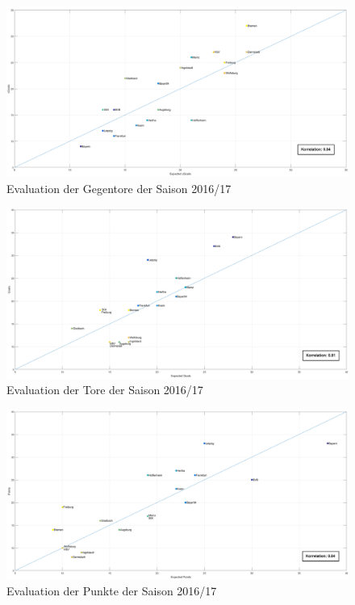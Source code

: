 \begin{figure}
\centering
\includegraphics[scale=0.3]{se-wa-jpg/cGoals_correlation_16_17}
\caption{Evaluation der Gegentore der Saison 2016/17}
\label{lines}
\end{figure}

\begin{figure}
\centering
\includegraphics[scale=0.3]{se-wa-jpg/goals_correlation_16_17}
\caption{Evaluation der Tore der Saison 2016/17}
\label{lines}
\end{figure}

\begin{figure}
\centering
\includegraphics[scale=0.3]{se-wa-jpg/points_correlation_16_17}
\caption{Evaluation der Punkte der Saison 2016/17}
\label{lines}
\end{figure}



